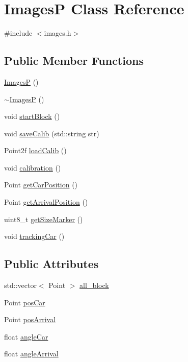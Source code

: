 \hypertarget{class_images_p}{\section{Images\-P Class Reference}
\label{class_images_p}
}


{\ttfamily \#include $<$images.\-h$>$}

\subsection*{Public Member Functions}
\begin{DoxyCompactItemize}
\item 
\hyperlink{class_images_p_a18ff58308b1ba5787e1d05f0acd7224a}{Images\-P} ()
\item 
\hyperlink{class_images_p_abd4ea58f9cb814dbb27feb5d2d793e53}{$\sim$\-Images\-P} ()
\item 
void \hyperlink{class_images_p_ae2aecf8db20e7b3bcd14a7182dfdaf29}{start\-Block} ()
\item 
void \hyperlink{class_images_p_aeb7483dee60e755fffcc9e6f9355fd43}{save\-Calib} (std\-::string str)
\item 
Point2f \hyperlink{class_images_p_a4048e5f515cb51cbf25211ec8b4854b7}{load\-Calib} ()
\item 
void \hyperlink{class_images_p_a799c4550d96659d7d188b03f52bb9f4a}{calibration} ()
\item 
Point \hyperlink{class_images_p_afe9cff50f49fc67bd8938d8d0223fe81}{get\-Car\-Position} ()
\item 
Point \hyperlink{class_images_p_aaf0d33634f747f1defec833fbc6dfae2}{get\-Arrival\-Position} ()
\item 
uint8\-\_\-t \hyperlink{class_images_p_a002bb2f3148a85c46c954dcc98ad2760}{get\-Size\-Marker} ()
\item 
void \hyperlink{class_images_p_adf17333e9b35092e96fef60bbbf80d74}{tracking\-Car} ()
\end{DoxyCompactItemize}
\subsection*{Public Attributes}
\begin{DoxyCompactItemize}
\item 
std\-::vector$<$ Point $>$ \hyperlink{class_images_p_ab9e279526694a7ce421cfa11b9309ed1}{all\-\_\-block}
\item 
Point \hyperlink{class_images_p_a79d1d01bae703caeee1033425e4f8f18}{pos\-Car}
\item 
Point \hyperlink{class_images_p_a621b649c63d3967849103c03082af64c}{pos\-Arrival}
\item 
float \hyperlink{class_images_p_a39c69bdd9469b4b8a2c9666e27afa7b0}{angle\-Car}
\item 
float \hyperlink{class_images_p_a408c61aeceb9175481adb2daca707a48}{angle\-Arrival}
\end{DoxyCompactItemize}


